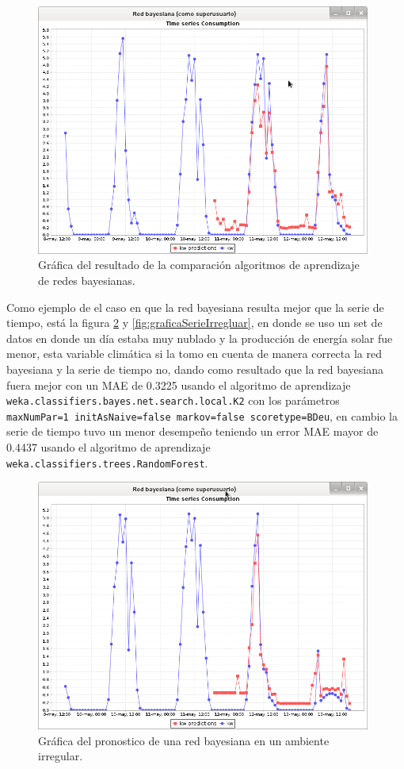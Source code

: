 \begin{figure}[!ht]
	\centering
	\includegraphics[width=11cm]{img/graficaResultadosCompRed.png}
	\caption{Gráfica del resultado de la comparación algoritmos de aprendizaje de redes bayesianas.}
	\label{fig:GraficaResultadosCompRed}
\end{figure}

Como ejemplo de el caso en que la red bayesiana resulta mejor que la serie de tiempo, está la 
figura \ref{fig:graficaRedBayesianaIrregluar} y \ref{fig:graficaSerieIrregluar}, 
en donde se uso un set de datos en donde un día estaba muy nublado y la producción de energía solar fue menor, esta variable climática si la tomo en cuenta de manera correcta la red bayesiana y la serie de tiempo no, dando como resultado que la red bayesiana fuera mejor con un MAE de 0.3225 usando el algoritmo de aprendizaje \texttt{weka.classifiers.bayes.net.search.local.K2} con los parámetros \texttt{maxNumPar=1 initAsNaive=false markov=false scoretype=BDeu}, en cambio la serie de tiempo tuvo un menor desempeño teniendo un error MAE mayor de 0.4437 usando el algoritmo de aprendizaje \texttt{weka.classifiers.trees.RandomForest}.

\begin{figure}[!h]
	\centering
	\includegraphics[width=11cm]{img/graficaRedBayesianaIrregluar.png}
	\caption{Gráfica del pronostico de una red bayesiana en un ambiente irregular.}
	\label{fig:graficaRedBayesianaIrregluar}
\end{figure}

